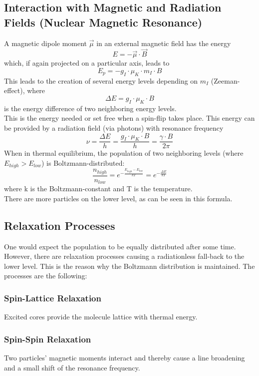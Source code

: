 \subsection{Interaction with Magnetic and Radiation Fields (Nuclear Magnetic Resonance)}
A magnetic dipole moment $\vec{\mu}$ in an external magnetic field has the energy \\
\[E=-\vec{\mu}\cdot\vec{B}\] which, if again projected on a particular axis, leads to \[E_{p}=-g_{I}\cdot\mu_{K}\cdot m_{I}\cdot B\]
This leads to the creation of several energy levels depending on $m_{I}$ (Zeeman-effect), where \[\Delta E=g_{I}\cdot\mu_{K}\cdot B\] is the energy difference of two neighboring energy levels.\\
This is the energy needed or set free when a spin-flip takes place. This energy can be provided by a radiation field (via photons) with resonance frequency 
\[\nu=\frac{\Delta E}{h}=\frac{g_{I}\cdot\mu_{K}\cdot B}{h}=\frac{\gamma\cdot B}{2\pi}\]
When in thermal equilibrium, the population of two neighboring levels (where $E_{high}> E_{low}$)  is Boltzmann-distributed:\\
\[\frac{n_{high}}{n_{low}}=e^{-\frac{E_{high}-E_{low}}{kT}}=e^{-\frac{\Delta E}{kT}}\] where k is the Boltzmann-constant and T is the temperature.\\
There are more particles on the lower level, as can be seen in this formula.
\subsection{Relaxation Processes}
One would expect the population to be equally distributed after some time. However, there are relaxation processes causing a radiationless fall-back to the lower level. This is the reason why the Boltzmann distribution is maintained. The processes are the following:\\
\subsubsection{Spin-Lattice Relaxation}
Excited cores provide the molecule lattice with thermal energy.
\subsubsection{Spin-Spin Relaxation}
Two particles' magnetic moments interact and thereby cause a line broadening and a small shift of the resonance frequency.
